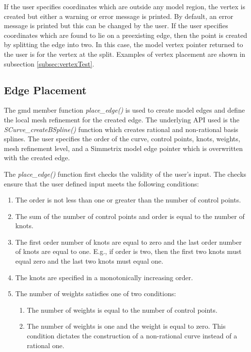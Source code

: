 \documentclass[a4paper, 12pt]{article}
\begin{document}
If the user specifies coordinates
which are outside any model region, the vertex is created but either a 
warning or error message is printed. By default, an error message is printed
but this can be changed by the user. If the user specifies coordinates 
which are found to lie on a preexisting edge, then the point is created
by splitting the edge into two. In this case, the model vertex pointer
returned to the user is for the vertex at the split.
Examples of vertex placement are shown in 
subsection \ref{subsec:vertexTest}.

\subsection{Edge Placement} \label{subsec:edge}
The gmd member function \emph{place\_edge()} is used
to create model edges and define the local mesh refinement 
for the created edge.  The underlying API used
is the \emph{SCurve\_createBSpline()} function which 
creates rational and non-rational
basis splines. The user specifies the order of the curve, 
control points, knots,
weights, mesh refinement level, and a Simmetrix model 
edge pointer which is 
overwritten with the created edge. 

The \emph{place\_edge()} function first checks the 
validity of the user's input.
The checks ensure that the user defined input meets 
the following conditions:
\begin{enumerate}
  \item The order is not less than one or greater than the number 
      of control points.
  \item The sum of the number of control points and order is equal to 
      the number of knots.
  \item The first order number of knots are equal to zero and 
      the last order number 
      of knots are equal to one. E.g., if order is two, then the first two 
      knots must equal zero and the last two knots must equal one.
  \item The knots are specified in a monotonically increasing order. 
  \item The number of weights satisfies one of two conditions:
    \begin{enumerate}
      \item The number of weights is equal to the number of control points.
      \item The number of weights is one and the weight is equal to zero. 
          This condition dictates the construction of a non-rational curve
          instead of a rational one.
    \end{enumerate}
\end{enumerate}
\end{document}
